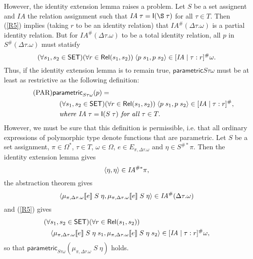 \documentclass[sigplan,screen,nonacm,balance=false]{acmart}
\makeatletter
\theoremstyle{plain}
\DeclarePairedDelimiter{\pair}{\langle}{\rangle}
\DeclarePairedDelimiter{\interp}{\llbracket}{\rrbracket}
\newcommand{\ie}{i.e.\@\xspace}
\newcommand{\IA}{\mathit{IA}}
\newcommand{\Rel}{\mathsf{Rel}}
\newcommand{\Id}{\mathsf{I}}
\newcommand{\SET}{\mathsf{SET}}
\newcommand{\para}{\mathsf{parametric}}
\makeatother
\begin{document}
However, the identity extension lemma raises a problem.
Let $S$ be a set assignent and $\IA$ the relation assignment such that $\IA \; \tau = \Id(\S \; \tau)$ for all $\tau \in T$.
Then (\ref{R5}) implies (taking $r$ to be an identity relation) that $\IA^\#(\Delta \tau. \omega)$ is a partial identity relation.
But for $\IA^\#(\Delta \tau. \omega)$ to be a total identity relation, all $p$ in $S^\#(\Delta \tau. \omega)$ must statisfy
%
\begin{equation*}
  (\forall s_1, s_2 \in \SET) (\forall r \in \Rel(s_1, s_2)) \; \pair{p \; s_1, p \; s_2} \in [\IA \mid \tau: r]^\# \omega.
\end{equation*}
%
Thus, if the identity extension lemma is to remain true, $\para{S \tau \omega}$ must be at least as restrictive as the following definition:
%
\begin{align*}\tag{PAR}\label{PAR}
  & \para_{S \tau \omega}(p) = \\
  & \quad (\forall s_1, s_2 \in \SET) (\forall r \in \Rel(s_1, s_2)) \; \pair{p \; s_1, p \; s_2} \in [\IA \mid \tau: r]^\#, \\
  & \quad \textit{where } \IA \; \tau = \Id(S \; \tau) \textit{ for all } \tau \in T.
\end{align*}
%
However, we must be sure that this definition is permissible, \ie that all ordinary expressions of polymorphic type denote functions that are parametric.
Let $S$ be a set assignment, $\pi \in \Omega^*$, $\tau \in T$, $\omega \in \Omega$, $e \in E_{\pi, \Delta \tau. \omega}$ and $\eta \in S^{\#*} \pi$.
Then the identity extension lemma gives
%
\begin{equation*}
  \pair{\eta, \eta} \in \IA^{\#*} \pi,
\end{equation*}
%
the abstraction theorem gives
%
\begin{equation*}
  \pair{\mu_{\pi, \Delta \tau. \omega} \interp{e} \; S \; \eta, \mu_{\pi, \Delta \tau. \omega} \interp{e} \; S \; \eta} \in \IA^\#(\Delta \tau. \omega)
\end{equation*}
%
and (\ref{R5}) gives
%
\begin{align*}
  & (\forall s_1, s_2 \in \SET) (\forall r \in \Rel(s_1, s_2)) \\
  & \quad \pair{\mu_{\pi, \Delta \tau. \omega} \interp{e} \; S \; \eta \; s_1, \mu_{\pi, \Delta \tau. \omega} \interp{e} \; S \; \eta \; s_2} \in [\IA \mid \tau: r] ^\# \omega,
\end{align*}
%
so that $\para_{S \tau \omega}(\mu_{\pi, \Delta \tau. \omega} \; S \; \eta)$ holds.
\end{document}
